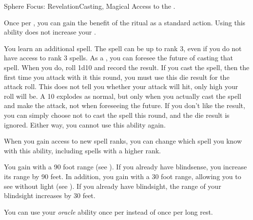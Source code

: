     \begin{magicalfeat}{Sphere Focus: Revelation}{Casting, Magical}
        \featpre Access to the  .

         Once per , you can gain the benefit of the  ritual as a standard action.
        Using this ability does not increase your .

         You learn an additional spell.
        The spell can be up to rank 3, even if you do not have access to rank 3 spells.
        As a , you can foresee the future of casting that spell.
        When you do, roll 1d10 and record the result.
        If you cast the spell, then the first time you attack with it this round, you must use this die result for the attack roll.
        This does not tell you whether your attack will hit, only high your roll will be.
        A 10 explodes as normal, but only when you actually cast the spell and make the attack, not when foreseeing the future.
        If you don't like the result, you can simply choose not to cast the spell this round, and the die result is ignored.
        Either way, you  cannot use this ability again.

        When you gain access to new spell ranks, you can change which spell you know with this ability, including spells with a higher rank.

         You gain  with a 90 foot range (see ).
        If you already have blindsense, you increase its range by 90 feet.
        In addition, you gain  with a 30 foot range, allowing you to see without light (see ).
        If you already have blindsight, the range of your blindsight increases by 30 feet.

         You can use your \textit{oracle} ability once per  instead of once per long rest.
    \end{magicalfeat}


